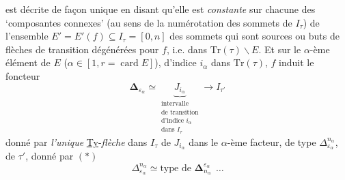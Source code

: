 est décrite de façon unique en disant qu'elle est \textit{constante} sur chacune des `composantes connexes' (au sens de la numérotation des sommets de $I_\tau$) de l'ensemble $E' = E'(f) \subseteq I_\tau = [0,n]$ des sommets qui sont sources ou buts de flèches de transition dégénérées pour $f$, i.e. dans $\mathrm{Tr}(\tau)\backslash E$. Et sur le $\alpha$-ème élément de $E$ ($\alpha \in [1, r = \operatorname{card} E]$), d'indice $i_\alpha$ dans $\mathrm{Tr}(\tau)$, $f$ induit le foncteur
\[
\boldsymbol{\Delta}_{\varepsilon_\alpha} \simeq \underbrace{J_{i_\alpha}}_{\substack{\text{intervalle}\\ \text{de transition}\\ \text{d'indice } i_\alpha\\ \text{dans } I_\tau}} \longrightarrow I_{\tau'}
\]
donné par \textit{l'unique} \underline{Ty}-\textit{flèche} dans $I_\tau$ de $J_{i_\alpha}$ dans le $\alpha$-ème facteur, de type $\Delta^{n_\alpha}_{\varepsilon_\alpha}$, de $\tau'$, donné par $(*)$
\[
\Delta^{n_\alpha}_{\varepsilon_\alpha} \simeq \text{type de } \boldsymbol{\Delta}^{\varepsilon_\alpha}_{n_\alpha}\ \ \ldots
\]

